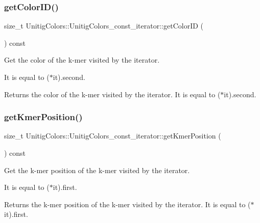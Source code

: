 \subsubsection{\texorpdfstring{get\+Color\+I\+D()}{getColorID()}}
{\footnotesize\ttfamily size\+\_\+t Unitig\+Colors\+::\+Unitig\+Colors\+\_\+const\+\_\+iterator\+::get\+Color\+ID (\begin{DoxyParamCaption}{ }\end{DoxyParamCaption}) const\hspace{0.3cm}{\ttfamily [inline]}}



Get the color of the k-\/mer visited by the iterator. 

It is equal to ($\ast$it).second. \begin{DoxyReturn}{Returns}
the color of the k-\/mer visited by the iterator. It is equal to ($\ast$it).second. 
\end{DoxyReturn}
\mbox{\label{classUnitigColors_1_1UnitigColors__const__iterator_aac088e18802033a09a5ff1336522fbca}} 
\subsubsection{\texorpdfstring{get\+Kmer\+Position()}{getKmerPosition()}}
{\footnotesize\ttfamily size\+\_\+t Unitig\+Colors\+::\+Unitig\+Colors\+\_\+const\+\_\+iterator\+::get\+Kmer\+Position (\begin{DoxyParamCaption}{ }\end{DoxyParamCaption}) const\hspace{0.3cm}{\ttfamily [inline]}}



Get the k-\/mer position of the k-\/mer visited by the iterator. 

It is equal to ($\ast$it).first. \begin{DoxyReturn}{Returns}
the k-\/mer position of the k-\/mer visited by the iterator. It is equal to ($\ast$it).first. 
\end{DoxyReturn}
\mbox{\label{classUnitigColors_1_1UnitigColors__const__iterator_ae7c489b968f06a0b713bd7244d75aeca}} 
